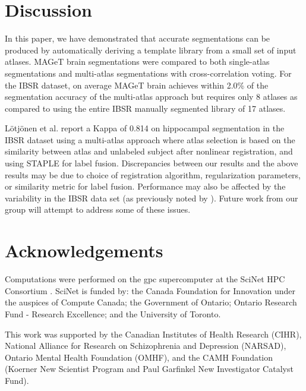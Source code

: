 \documentclass{article}\usepackage[]{graphicx}\usepackage[]{color}
\begin{document}
\section{Discussion}

In this paper, we have demonstrated that accurate segmentations can be produced
by automatically deriving a template library from a small set of input atlases.
MAGeT brain segmentations were compared to both single-atlas segmentations and
multi-atlas segmentations with cross-correlation voting.  For the IBSR dataset,
on average MAGeT brain achieves within 2.0\% of the segmentation accuracy of
the multi-atlas approach but requires only 8 atlases as compared to using the
entire IBSR manually segmented library of 17 atlases.

L\"{o}tj\"{o}nen et al. \citep{Lotjonen2010} report a Kappa of 0.814 on
hippocampal segmentation in the IBSR dataset using a multi-atlas approach where
atlas selection is based on the similarity between atlas and unlabeled subject
after nonlinear registration, and using STAPLE \citep{Warfield2004} for label
fusion.  Discrepancies between our results and the above results may be due to
choice of registration algorithm, regularization parameters, or similarity
metric for label fusion.  Performance may also be affected by the variability
in the IBSR data set (as previously noted by \citep{Klein2009}).  Future work
from our group will attempt to address some of these issues.

\section{Acknowledgements}
Computations were performed on the gpc supercomputer at the SciNet HPC
Consortium \citep{Loken2010}. SciNet is funded by: the Canada Foundation for
Innovation under the auspices of Compute Canada; the Government of Ontario;
Ontario Research Fund - Research Excellence; and the University of Toronto.

This work was supported by the Canadian Institutes of Health Research (CIHR),
National Alliance for Research on Schizophrenia and Depression (NARSAD),
Ontario Mental Health Foundation (OMHF), and the CAMH Foundation (Koerner New
Scientist Program and Paul Garfinkel New Investigator Catalyst Fund).


\end{document}
